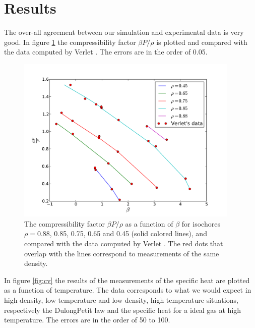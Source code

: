 \documentclass{article}
\begin{document}

\section{Results}
The over-all agreement between our simulation and experimental data is very good. In figure \ref{fig:pressure} the compressibility factor $\beta P/\rho$ is plotted and compared with the data computed by Verlet \citep{PhysRev.159.98}. The errors are in the order of 0.05. \\

\begin{figure}[!htb]
  \centering
    \includegraphics[height=80mm]{P.pdf}
  \caption[]{The compressibility factor $\beta P/\rho$ as a function of $\beta$ for isochores $\rho=0.88$, 0.85, 0.75, 0.65 and 0.45 (solid colored lines), and compared with the data computed by Verlet \citep{PhysRev.159.98}. The red dots that overlap with the lines correspond to measurements of the same density.}
  \label{fig:pressure}
\end{figure}

In figure \ref{fig:cv} the results of the measurements of the specific heat are plotted as a function of temperature. The data corresponds to what we would expect in high density, low temperature and low density, high temperature situations, respectively the Dulong\text{-}Petit law and the specific heat for a ideal gas at high temperature. The errors are in the order of 50 to 100.\\ 
\end{document}
